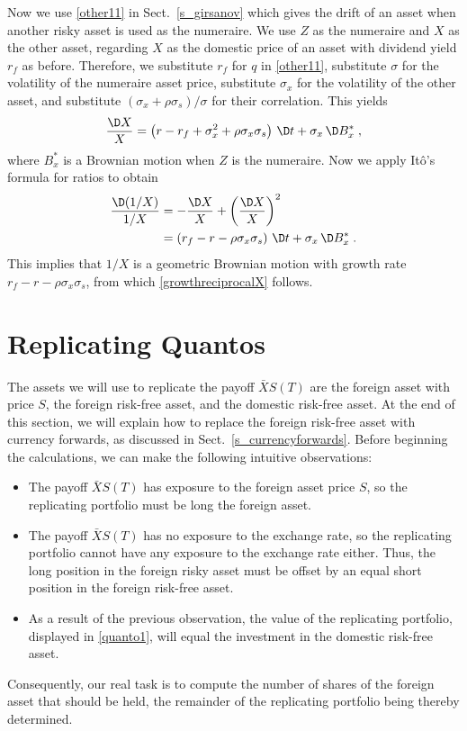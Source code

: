 \begin{petit}
Now we use \eqref{other11} in Sect.~\ref{s_girsanov} which gives  the drift of an asset when another risky asset is used as the numeraire.  We use $Z$ as the numeraire and $X$ as the other asset, regarding $X$ as the domestic price of an asset with dividend yield $r_f$ as before.  Therefore, we substitute $r_f$ for $q$ in  \eqref{other11}, substitute $\sigma$ for the volatility of the numeraire asset price, substitute $\sigma_x$ for the volatility of the other asset, and substitute $(\sigma_x+\rho\sigma_s)/\sigma$ for their correlation.  This yields
$$\frac{\D X}{X} = \left(r-r_f+\sigma_x^2+\rho\sigma_x\sigma_s\right)\,\D t + \sigma_x\,\D B^*_x\; ,$$
where $B^*_x$ is a Brownian motion when $Z$ is the numeraire.  
Now we apply It\^o's formula for ratios to obtain
\begin{align*}
\frac{\D (1/X)}{1/X} &= -\frac{\D X}{X} + \left(\frac{\D X}{X}\right)^2\\
&= \left(r_f-r-\rho\sigma_x\sigma_s\right)\,\D t + \sigma_x\,\D B^*_x\;.
\end{align*}
This implies  that $1/X$ is a geometric Brownian motion with growth rate $r_f-r-\rho\sigma_x\sigma_s$, from which \eqref{growthreciprocalX} follows.
\end{petit}

\section{Replicating Quantos}\label{s_replicatingquantos}

The assets we will use to replicate the payoff $\bar{X}S(T)$ are the foreign asset with price $S$, the foreign risk-free asset, and the domestic risk-free asset.  At the end of this section, we will explain how to replace the foreign risk-free asset with currency forwards, as discussed in Sect.~\ref{s_currencyforwards}.  Before beginning the calculations, we can make the following intuitive observations: 
\begin{itemize}
\item  The payoff $\bar{X}S(T)$ has exposure to the foreign asset price $S$, so the replicating portfolio must be long the foreign asset.  
\item The payoff $\bar{X}S(T)$ has no exposure to the exchange rate, so the replicating portfolio cannot have any exposure to the exchange rate either.  Thus, the long position in the foreign risky asset must be offset by an equal short position in the foreign risk-free asset.  
\item As a result of the previous observation, the value of the replicating portfolio, displayed in \eqref{quanto1}, will equal the investment in the domestic risk-free asset.  
\end{itemize}
Consequently, our real task is to compute the number of shares of the foreign asset that should be held, the remainder of the replicating portfolio being thereby determined.

